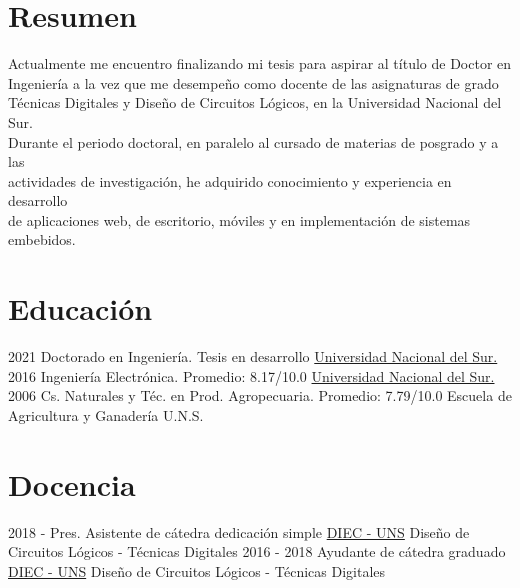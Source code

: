 \documentclass[letterpaper]{twentysecondcv} %
\begin{document}
\makeprofilefirst %

\section{Resumen}
\begin{twenty}

Actualmente me encuentro finalizando mi tesis para aspirar al título de Doctor en \\
Ingeniería a la vez que me desempeño como docente de las asignaturas de grado \\
Técnicas Digitales y Diseño de Circuitos Lógicos, en la Universidad Nacional del Sur.\\

Durante el periodo doctoral, en paralelo al cursado de materias de posgrado y a las \\
actividades de investigación, he adquirido conocimiento y experiencia en desarrollo \\
de aplicaciones web, de escritorio, móviles y en implementación de sistemas \\
embebidos.

\end{twenty}

\section{Educación}
\begin{twenty}
    \twentyitem
        {2021}
        {}
        {Doctorado en Ingeniería.}
        {Tesis en desarrollo}
        {\href{http://www.uns.edu.ar/}{Universidad Nacional del Sur.}}
        {}
    \twentyitem
        {2016}
        {}
        {Ingeniería Electrónica.}
        {Promedio: 8.17/10.0}
        {\href{http://www.uns.edu.ar/}{Universidad Nacional del Sur.}}
        {}
    \twentyitem
        {2006}
        {}
        {Cs. Naturales y Téc. en Prod. Agropecuaria.}
        {Promedio: 7.79/10.0}
        {Escuela de Agricultura y Ganadería U.N.S.}
        {}
\end{twenty}

\section{Docencia}
\begin{twenty}
    \twentyitem
        {2018 - Pres.}
        {}
        {Asistente de cátedra dedicación simple}
        {\href{http://www.diec.uns.edu.ar/}{DIEC - UNS}}
        {}
        {Diseño de Circuitos Lógicos - Técnicas Digitales}
    \twentyitem
        {2016 - 2018}
        {}
        {Ayudante de cátedra graduado}
        {\href{http://www.diec.uns.edu.ar/}{DIEC - UNS}}
        {}
        {Diseño de Circuitos Lógicos - Técnicas Digitales}
\end{twenty}
\end{document}
